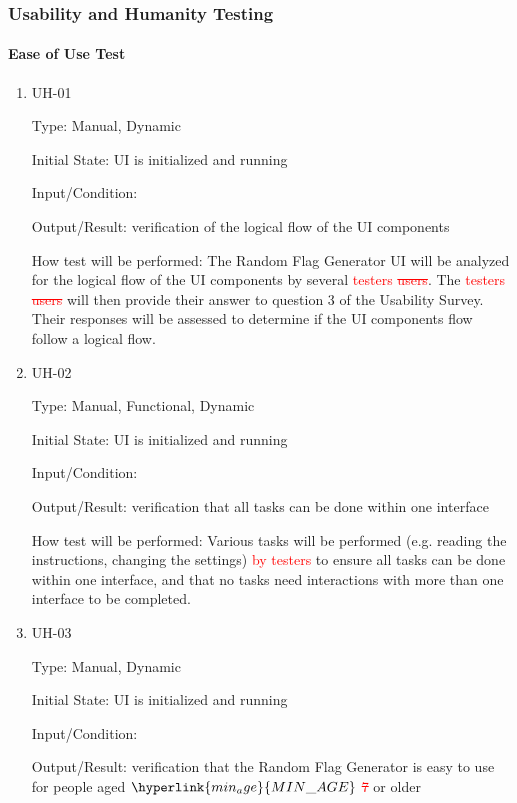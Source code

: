 \documentclass[12pt, titlepage]{article}
\begin{document}
\subsubsection{Usability and Humanity Testing}

\paragraph{Ease of Use Test}

\begin{enumerate}

\item{UH-01\\}

Type: Manual, Dynamic

Initial State: UI is initialized and running

Input/Condition: 

Output/Result: verification of the logical flow of the UI components

How test will be performed: The Random Flag Generator UI will be analyzed for
the logical flow of the UI components by several \textcolor{red}{testers
\sout{users}}. The \textcolor{red}{testers \sout{users}} will then provide
their answer to question 3 of the Usability Survey. Their responses will be
assessed to determine if the UI components flow follow a logical flow.

\item{UH-02\\}

Type: Manual, Functional, Dynamic

Initial State: UI is initialized and running

Input/Condition: 

Output/Result: verification that all tasks can be done within one interface

How test will be performed: Various tasks will be performed (e.g. reading the
instructions, changing the settings) \textcolor{red}{by testers} to ensure all
tasks can be done within one interface, and that no tasks need interactions
with more than one interface to be completed.

\item{UH-03\\}

Type: Manual, Dynamic

Initial State: UI is initialized and running

Input/Condition: 

Output/Result: verification that the Random Flag Generator is easy to use for
people aged \textcolor{red}{$\hyperlink{min_age}{MIN\_AGE}$ \sout{7}} or older


\end{enumerate}
\end{document}

